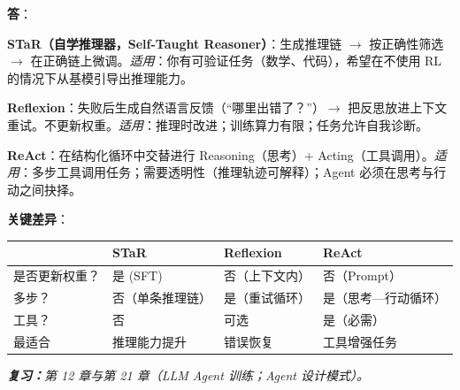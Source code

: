 \begin{questionbox}
\textbf{答}：

\textbf{STaR（自学推理器，Self-Taught Reasoner）}：生成推理链 $\to$ 按正确性筛选 $\to$ 在正确链上微调。\emph{适用}：你有可验证任务（数学、代码），希望在不使用 RL 的情况下从基模引导出推理能力。

\textbf{Reflexion}：失败后生成自然语言反馈（“哪里出错了？”）$\to$ 把反思放进上下文重试。不更新权重。\emph{适用}：推理时改进；训练算力有限；任务允许自我诊断。

\textbf{ReAct}：在结构化循环中交替进行 Reasoning（思考）+ Acting（工具调用）。\emph{适用}：多步工具调用任务；需要透明性（推理轨迹可解释）；Agent 必须在思考与行动之间抉择。

\textbf{关键差异}：

\begin{center}
\begin{tabular}{@{}l l l l@{}}
\toprule
 & \textbf{STaR} & \textbf{Reflexion} & \textbf{ReAct} \\
\midrule
是否更新权重？ & 是 (SFT) & 否（上下文内） & 否（Prompt） \\
多步？ & 否（单条推理链） & 是（重试循环） & 是（思考—行动循环） \\
工具？ & 否 & 可选 & 是（必需） \\
最适合 & 推理能力提升 & 错误恢复 & 工具增强任务 \\
\bottomrule
\end{tabular}
\end{center}

\emph{\textbf{复习：}第 12 章与第 21 章（LLM Agent 训练；Agent 设计模式）。}
\end{questionbox}

